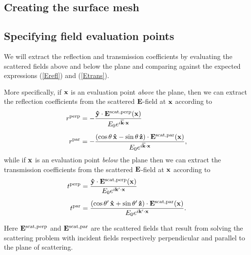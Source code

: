 \documentclass[letterpaper]{article}
\begin{document}
\subsection{Creating the surface mesh}

\subsection{Specifying field evaluation points}

We will extract the reflection and transmission coefficients 
by evaluating the scattered fields above and below the 
plane and comparing against the expected expressions
(\ref{Erefl}) and (\ref{Etrans}).

More specifically, if $\mathbf{x}$ is an 
evaluation point \textit{above} the plane, then we can extract the
reflection coefficients from the scattered $\mathbf{E}$-field at $\mathbf{x}$
according to 
\begin{align*}
 r^{\hbox{\scriptsize{perp}}} 
 &= -\frac{\mathbf{\hat y} \cdot \mathbf{E}^{\hbox{\scriptsize{scat,perp}}}(\mathbf{x})}
          {E_0 e^{i\overline{\mathbf{k}}\cdot \mathbf{x}}}
\\[5pt]
 r^{\hbox{\scriptsize{par}}} 
 &= -\frac{ (\cos\theta\,\mathbf{\hat x} - \sin\theta\,\mathbf{\hat z})
            \cdot \mathbf{E}^{\hbox{\scriptsize{scat,par}}}(\mathbf{x})}
          {E_0 e^{i\overline{\mathbf{k}}\cdot \mathbf{x}}},
\end{align*}
while if $\mathbf{x}$ is an evaluation point \textit{below} the 
plane then we can extract the transmission coefficients from the 
scattered $\mathbf{E}$-field at $\mathbf{x}$ according to 
\begin{align*}
 t^{\hbox{\scriptsize{perp}}} 
 &= \frac{\mathbf{\hat y} \cdot \mathbf{E}^{\hbox{\scriptsize{scat,perp}}}(\mathbf{x})}
         {E_0 e^{i\mathbf{k}^\prime \cdot \mathbf{x}}}
\\[5pt]
 t^{\hbox{\scriptsize{par}}} 
 &= \frac{ (\cos\theta^\prime\,\mathbf{\hat x} + \sin\theta^\prime\,\mathbf{\hat z})
            \cdot \mathbf{E}^{\hbox{\scriptsize{scat,par}}}(\mathbf{x})}
         {E_0 e^{i\mathbf{k}^\prime\cdot \mathbf{x}}}.
\end{align*}

Here $\mathbf{E}^{\hbox{\scriptsize{scat,perp}}}$ and $\mathbf{E}^{\hbox{\scriptsize{scat,par}}}$ are the 
scattered fields that result from solving the scattering problem
with incident fields respectively perpendicular and parallel to 
the plane of scattering.
\end{document}
